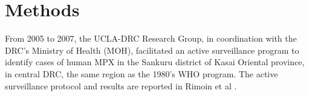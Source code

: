 \section{Methods}

From 2005 to 2007, the UCLA-DRC Research Group, in coordination with the DRC’s Ministry of Health (MOH), facilitated an active surveillance program to identify cases of human MPX in the Sankuru district of Kasai Oriental province, in central DRC, the same region as the 1980’s WHO program. The active surveillance protocol and results are reported in Rimoin et al \cite{Rimoin2010}.